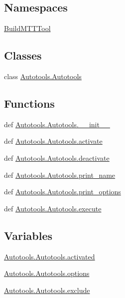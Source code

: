 \subsection*{Namespaces}
\begin{DoxyCompactItemize}
\item 
\hyperlink{namespace_build_m_t_t_tool}{Build\-M\-T\-T\-Tool}
\end{DoxyCompactItemize}
\subsection*{Classes}
\begin{DoxyCompactItemize}
\item 
class \hyperlink{class_autotools_1_1_autotools}{Autotools.\-Autotools}
\end{DoxyCompactItemize}
\subsection*{Functions}
\begin{DoxyCompactItemize}
\item 
def \hyperlink{group___tools_ga5b5ac092ad7f4bc45bf785633c8be95a}{Autotools.\-Autotools.\-\_\-\-\_\-init\-\_\-\-\_\-}
\item 
def \hyperlink{group___tools_ga202b0e727db575d20a381cd039dd3597}{Autotools.\-Autotools.\-activate}
\item 
def \hyperlink{group___tools_ga74513a2f4135b506e66c047559f9571e}{Autotools.\-Autotools.\-deactivate}
\item 
def \hyperlink{group___tools_ga0873459245ef2255a5a7386957fa592e}{Autotools.\-Autotools.\-print\-\_\-name}
\item 
def \hyperlink{group___tools_ga41481e9f2a7e7fce32f51cc8feb909fd}{Autotools.\-Autotools.\-print\-\_\-options}
\item 
def \hyperlink{group___tools_ga5ae85e70e9e6252f4be23ef60624f633}{Autotools.\-Autotools.\-execute}
\end{DoxyCompactItemize}
\subsection*{Variables}
\begin{DoxyCompactItemize}
\item 
\hyperlink{group___tools_ga6bbb714a91bc8b6fe749326772b073b3}{Autotools.\-Autotools.\-activated}
\item 
\hyperlink{group___tools_ga8b348e19f0a7104bde9c43c3a6ed695d}{Autotools.\-Autotools.\-options}
\item 
\hyperlink{group___tools_gaee37d9789ea22ee310ebc357cd721b7f}{Autotools.\-Autotools.\-exclude}
\end{DoxyCompactItemize}


